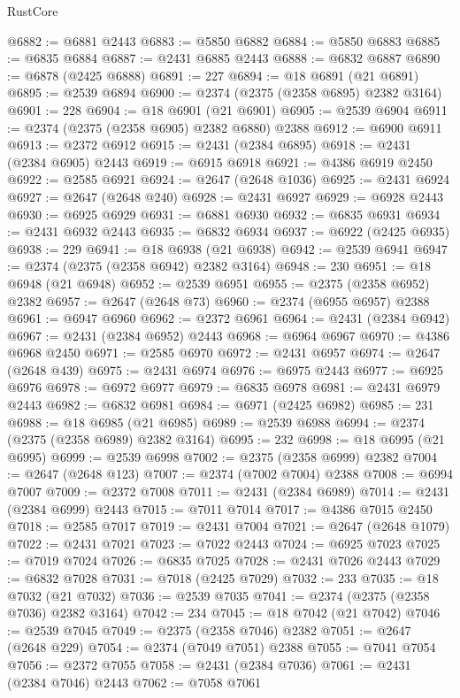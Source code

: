 \begin{lexlean}{RustCore}
\begin{coremodule}
@6882 := @6881 @2443
@6883 := @5850 @6882
@6884 := @5850 @6883
@6885 := @6835 @6884
@6887 := @2431 @6885 @2443
@6888 := @6832 @6887
@6890 := @6878 (@2425 @6888)
@6891 := 227
@6894 := @18 @6891 (@21 @6891)
@6895 := @2539 @6894
@6900 := @2374 (@2375 (@2358 @6895) @2382 @3164)
@6901 := 228
@6904 := @18 @6901 (@21 @6901)
@6905 := @2539 @6904
@6911 := @2374 (@2375 (@2358 @6905) @2382 @6880) @2388
@6912 := @6900 @6911
@6913 := @2372 @6912
@6915 := @2431 (@2384 @6895)
@6918 := @2431 (@2384 @6905) @2443
@6919 := @6915 @6918
@6921 := @4386 @6919 @2450
@6922 := @2585 @6921
@6924 := @2647 (@2648 @1036)
@6925 := @2431 @6924
@6927 := @2647 (@2648 @240)
@6928 := @2431 @6927
@6929 := @6928 @2443
@6930 := @6925 @6929
@6931 := @6881 @6930
@6932 := @6835 @6931
@6934 := @2431 @6932 @2443
@6935 := @6832 @6934
@6937 := @6922 (@2425 @6935)
@6938 := 229
@6941 := @18 @6938 (@21 @6938)
@6942 := @2539 @6941
@6947 := @2374 (@2375 (@2358 @6942) @2382 @3164)
@6948 := 230
@6951 := @18 @6948 (@21 @6948)
@6952 := @2539 @6951
@6955 := @2375 (@2358 @6952) @2382
@6957 := @2647 (@2648 @73)
@6960 := @2374 (@6955 @6957) @2388
@6961 := @6947 @6960
@6962 := @2372 @6961
@6964 := @2431 (@2384 @6942)
@6967 := @2431 (@2384 @6952) @2443
@6968 := @6964 @6967
@6970 := @4386 @6968 @2450
@6971 := @2585 @6970
@6972 := @2431 @6957
@6974 := @2647 (@2648 @439)
@6975 := @2431 @6974
@6976 := @6975 @2443
@6977 := @6925 @6976
@6978 := @6972 @6977
@6979 := @6835 @6978
@6981 := @2431 @6979 @2443
@6982 := @6832 @6981
@6984 := @6971 (@2425 @6982)
@6985 := 231
@6988 := @18 @6985 (@21 @6985)
@6989 := @2539 @6988
@6994 := @2374 (@2375 (@2358 @6989) @2382 @3164)
@6995 := 232
@6998 := @18 @6995 (@21 @6995)
@6999 := @2539 @6998
@7002 := @2375 (@2358 @6999) @2382
@7004 := @2647 (@2648 @123)
@7007 := @2374 (@7002 @7004) @2388
@7008 := @6994 @7007
@7009 := @2372 @7008
@7011 := @2431 (@2384 @6989)
@7014 := @2431 (@2384 @6999) @2443
@7015 := @7011 @7014
@7017 := @4386 @7015 @2450
@7018 := @2585 @7017
@7019 := @2431 @7004
@7021 := @2647 (@2648 @1079)
@7022 := @2431 @7021
@7023 := @7022 @2443
@7024 := @6925 @7023
@7025 := @7019 @7024
@7026 := @6835 @7025
@7028 := @2431 @7026 @2443
@7029 := @6832 @7028
@7031 := @7018 (@2425 @7029)
@7032 := 233
@7035 := @18 @7032 (@21 @7032)
@7036 := @2539 @7035
@7041 := @2374 (@2375 (@2358 @7036) @2382 @3164)
@7042 := 234
@7045 := @18 @7042 (@21 @7042)
@7046 := @2539 @7045
@7049 := @2375 (@2358 @7046) @2382
@7051 := @2647 (@2648 @229)
@7054 := @2374 (@7049 @7051) @2388
@7055 := @7041 @7054
@7056 := @2372 @7055
@7058 := @2431 (@2384 @7036)
@7061 := @2431 (@2384 @7046) @2443
@7062 := @7058 @7061

\end{coremodule}
\end{lexlean}
